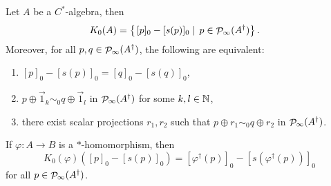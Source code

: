 \begin{proposition} \label{prop:StandardPictureK0}
Let $A$ be a $C^*$-algebra, then
\begin{align*}
K_{0}(A) &= \left\{\left. [p]_0 - [s(p)]_0 \;\right|\; p \in \mathop{\mathcal{P}}\nolimits_\infty(A^\dagger) \right\}.
\end{align*}
Moreover, for all $p,q\in\mathop{\mathcal{P}}\nolimits_\infty(A^\dagger)$, the following are equivalent:
\begin{enumerate}
\item $[p]_0-[s(p)]_0 = [q]_0 - [s(q)]_0$,
\item $p\oplus \vec{1}_k \sim_0 q \oplus \vec{1}_l$ in $\mathop{\mathcal{P}}\nolimits_\infty(A^\dagger)$ for some $k,l\in \mathbb{N}$,
\item there exist scalar projections $r_1, r_2$ such that $p\oplus r_1 \sim_0 q \oplus r_2$ in $\mathop{\mathcal{P}}\nolimits_\infty(A^\dagger)$.
\end{enumerate}
If $\varphi:A\to B$ is a $*$-homomorphism, then
\[ K_0(\varphi)([p]_0 - [s(p)]_0) = [\varphi^\dagger(p)]_0 - [s(\varphi^\dagger(p))]_0 \]
for all $p\in \mathop{\mathcal{P}}\nolimits_\infty(A^\dagger)$.
\end{proposition}
